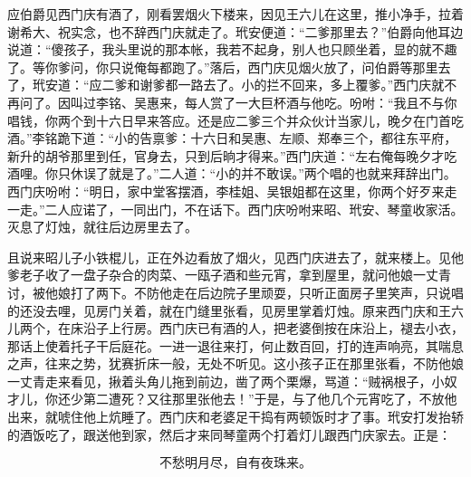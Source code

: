 应伯爵见西门庆有酒了，刚看罢烟火下楼来，因见王六儿在这里，推小净手，拉着谢希大、祝实念，也不辞西门庆就走了。玳安便道：“二爹那里去？”伯爵向他耳边说道：“傻孩子，我头里说的那本帐，我若不起身，别人也只顾坐着，显的就不趣了。等你爹问，你只说俺每都跑了。”落后，西门庆见烟火放了，问伯爵等那里去了，玳安道：“应二爹和谢爹都一路去了。小的拦不回来，多上覆爹。”西门庆就不再问了。因叫过李铭、吴惠来，每人赏了一大巨杯酒与他吃。吩咐：“我且不与你唱钱，你两个到十六日早来答应。还是应二爹三个并众伙计当家儿，晚夕在门首吃酒。”李铭跪下道：“小的告禀爹：十六日和吴惠、左顺、郑奉三个，都往东平府，新升的胡爷那里到任，官身去，只到后晌才得来。”西门庆道：“左右俺每晚夕才吃酒哩。你只休误了就是了。”二人道：“小的并不敢误。”两个唱的也就来拜辞出门。西门庆吩咐：“明日，家中堂客摆酒，李桂姐、吴银姐都在这里，你两个好歹来走一走。”二人应诺了，一同出门，不在话下。西门庆吩咐来昭、玳安、琴童收家活。灭息了灯烛，就往后边房里去了。

且说来昭儿子小铁棍儿，正在外边看放了烟火，见西门庆进去了，就来楼上。见他爹老子收了一盘子杂合的肉菜、一瓯子酒和些元宵，拿到屋里，就问他娘一丈青讨，被他娘打了两下。不防他走在后边院子里顽耍，只听正面房子里笑声，只说唱的还没去哩，见房门关着，就在门缝里张看，见房里掌着灯烛。原来西门庆和王六儿两个，在床沿子上行房。西门庆已有酒的人，把老婆倒按在床沿上，褪去小衣，那话上使着托子干后庭花。一进一退往来\textShan 打，何止数百回，\textShan 打的连声响亮，其喘息之声，往来之势，犹赛折床一般，无处不听见。这小孩子正在那里张看，不防他娘一丈青走来看见，揪着头角儿拖到前边，凿了两个栗爆，骂道：“贼祸根子，小奴才儿，你还少第二遭死？又往那里张他去！”于是，与了他几个元宵吃了，不放他出来，就唬住他上炕睡了。西门庆和老婆足干捣有两顿饭时才了事。玳安打发抬轿的酒饭吃了，跟送他到家，然后才来同琴童两个打着灯儿跟西门庆家去。正是：

\[
不愁明月尽，自有夜珠来。
\]
